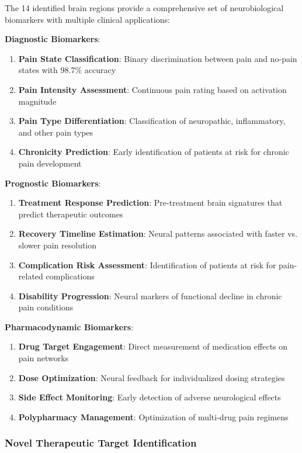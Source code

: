 \documentclass[10pt,journal,compsoc]{IEEEtran}
\begin{document}
The 14 identified brain regions provide a comprehensive set of neurobiological biomarkers with multiple clinical applications:

\textbf{Diagnostic Biomarkers}:

\begin{enumerate}
\item \textbf{Pain State Classification}: Binary discrimination between pain and no-pain states with 98.7\% accuracy
\item \textbf{Pain Intensity Assessment}: Continuous pain rating based on activation magnitude
\item \textbf{Pain Type Differentiation}: Classification of neuropathic, inflammatory, and other pain types
\item \textbf{Chronicity Prediction}: Early identification of patients at risk for chronic pain development
\end{enumerate}

\textbf{Prognostic Biomarkers}:

\begin{enumerate}
\item \textbf{Treatment Response Prediction}: Pre-treatment brain signatures that predict therapeutic outcomes
\item \textbf{Recovery Timeline Estimation}: Neural patterns associated with faster vs. slower pain resolution
\item \textbf{Complication Risk Assessment}: Identification of patients at risk for pain-related complications
\item \textbf{Disability Progression}: Neural markers of functional decline in chronic pain conditions
\end{enumerate}

\textbf{Pharmacodynamic Biomarkers}:

\begin{enumerate}
\item \textbf{Drug Target Engagement}: Direct measurement of medication effects on pain networks
\item \textbf{Dose Optimization}: Neural feedback for individualized dosing strategies
\item \textbf{Side Effect Monitoring}: Early detection of adverse neurological effects
\item \textbf{Polypharmacy Management}: Optimization of multi-drug pain regimens
\end{enumerate}

\subsubsection{Novel Therapeutic Target Identification}
\end{document}
